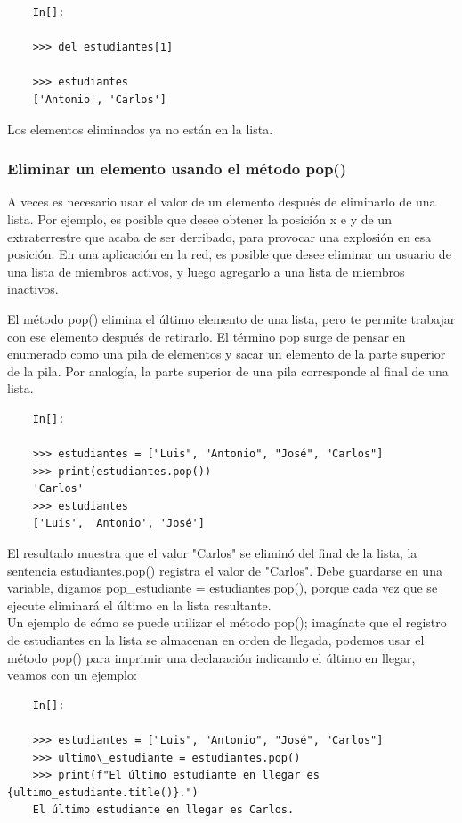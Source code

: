 \begin{lstlisting}
	In[]:
	
	>>> del estudiantes[1]
	
	>>> estudiantes
	['Antonio', 'Carlos']
\end{lstlisting}Los elementos eliminados ya  no están en la lista.

\subsubsection{Eliminar un elemento usando el método pop()}

A veces es necesario usar el valor de un elemento  después de eliminarlo de una
lista. Por ejemplo, es posible que desee obtener la posición {\ttfamily x} e {\ttfamily y} de un 
extraterrestre que acaba de ser derribado, para provocar una explosión en esa posición. En una aplicación en la red, es posible que desee eliminar un usuario de una lista de miembros activos, y luego agregarlo  a una lista de miembros inactivos.

El método {\ttfamily pop()} elimina el último elemento de una lista, pero te permite trabajar
con ese elemento después de retirarlo. 
El término pop surge de pensar en enumerado como una pila de elementos y sacar un elemento de la parte superior de la pila.  Por analogía, la parte superior de una pila corresponde al final de una lista.
\begin{lstlisting}
	In[]:
	
	>>> estudiantes = ["Luis", "Antonio", "José", "Carlos"]
	>>> print(estudiantes.pop())
	'Carlos'
	>>> estudiantes
	['Luis', 'Antonio', 'José']
\end{lstlisting} El resultado muestra que el valor {}"{}Carlos"{} se eliminó del final de
la lista, la sentencia {\ttfamily estudiantes.pop()}  registra el valor de {}"{}Carlos"{}. Debe guardarse en una  variable, digamos {\ttfamily pop\_estudiante = estudiantes.pop()}, porque cada vez que se ejecute eliminará el último en la lista resultante.  \\

Un ejemplo de cómo se puede utilizar el método {\ttfamily pop()}; imagínate que el registro de estudiantes en la lista se almacenan en orden de llegada, podemos usar el método {\ttfamily pop()} para imprimir una declaración indicando el último en llegar, veamos con un ejemplo:


\begin{lstlisting}
	In[]:
	
	>>> estudiantes = ["Luis", "Antonio", "José", "Carlos"]
	>>> ultimo\_estudiante = estudiantes.pop()
	>>> print(f"El último estudiante en llegar es {ultimo_estudiante.title()}.")
	El último estudiante en llegar es Carlos.
\end{lstlisting}



